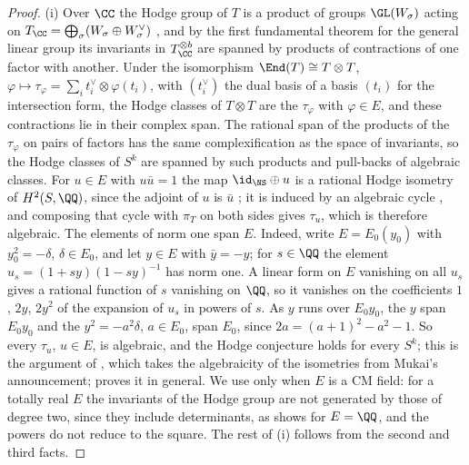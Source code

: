 \begin{proof}
(i) Over $\CC$ the Hodge group of $T$ is a product of groups
$\GL(W_{\sigma})$ acting on
$T_{\CC}=\bigoplus_{\sigma}(W_{\sigma}\oplus W_{\sigma}^{\vee})$
\cite{Zar83}, and by the first fundamental theorem for the general linear
group \cite[Chapter~5]{GW09} its invariants in $T_{\CC}^{\otimes b}$ are
spanned by products of contractions of one factor with another. Under the
isomorphism $\End(T)\cong T\otimes T$, $\varphi\mapsto\tau_{\varphi}=
\sum_{i}t_{i}^{\vee}\otimes\varphi(t_{i})$, with $(t_{i}^{\vee})$ the dual
basis of a basis $(t_{i})$ for the intersection form, the Hodge classes of
$T\otimes T$ are the $\tau_{\varphi}$ with $\varphi\in E$, and these
contractions lie in their complex span. The rational span of the products of
the $\tau_{\varphi}$ on pairs of factors has the same complexification as the
space of invariants, so the Hodge classes of $S^{k}$ are spanned by such
products and pull-backs of algebraic classes. For $u\in E$ with $u\bar u=1$
the map $\id_{\NS}\oplus u$ is a rational Hodge isometry of
$H^{2}(S,\QQ)$, since the adjoint of $u$ is $\bar u$ \cite{Zar83}; it is
induced by an algebraic cycle \cite{Bus19}, and composing that cycle with
$\pi_{T}$ on both sides gives $\tau_{u}$, which is therefore algebraic. The
elements of norm one span $E$. Indeed, write $E=E_{0}(y_{0})$ with
$y_{0}^{2}=-\delta$, $\delta\in E_{0}$, and let $y\in E$ with $\bar y=-y$; for
$s\in\QQ$ the element $u_{s}=(1+sy)(1-sy)^{-1}$ has norm one. A linear form
on $E$ vanishing on all $u_{s}$ gives a rational function of $s$ vanishing on
$\QQ$, so it vanishes on the coefficients $1$, $2y$, $2y^{2}$ of the expansion
of $u_{s}$ in powers of $s$. As $y$ runs over $E_{0}y_{0}$, the $y$ span
$E_{0}y_{0}$ and the $y^{2}=-a^{2}\delta$, $a\in E_{0}$, span $E_{0}$, since
$2a=(a+1)^{2}-a^{2}-1$. So every $\tau_{u}$, $u\in E$, is algebraic, and the
Hodge conjecture holds for every $S^{k}$; this is the argument of
\cite[Lemma~5.3, Theorem~5.4]{RM08}, which takes the algebraicity of the
isometries from Mukai's announcement; \cite{Bus19} proves it in general.
We use \cite{RM08} only when $E$ is a CM field: for a totally real $E$ the
invariants of the Hodge group are not generated by those of degree two, since
they include determinants, as  shows for $E=\QQ$, and
the powers do not reduce to the square. The rest of (i) follows
from the second and third facts.


\end{proof}
